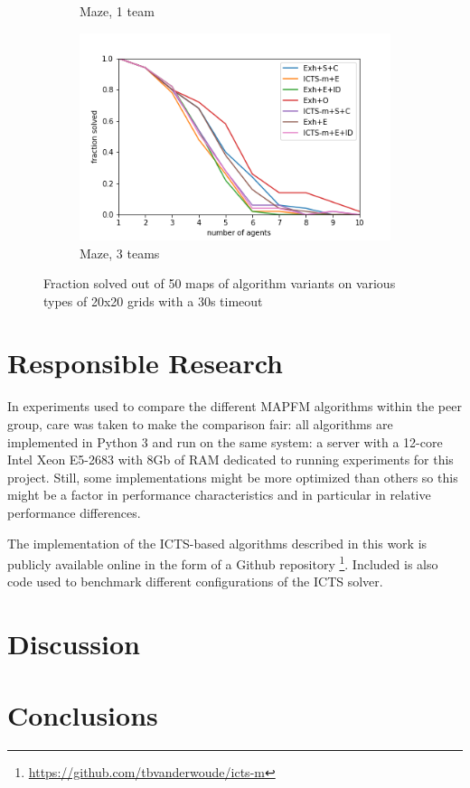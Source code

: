 \documentclass[english]{article}
\begin{document}
\begin{figure}
\begin{subfigure}{0.49\textwidth}
		\caption{Maze, 1 team}
		\label{fig:m1}
	\end{subfigure}
	\begin{subfigure}{0.49\textwidth}
		\centering
		\includegraphics[width=\linewidth]{img/results/maze-3-p}
		\caption{Maze, 3 teams}
		\label{fig:m3}
	\end{subfigure}
	\caption{Fraction solved out of 50 maps of algorithm variants on various types of 20x20 grids with a 30s timeout}
	\label{fig:bottom}
\end{figure}
	\section{Responsible Research}
	In experiments used to compare the different MAPFM algorithms within the peer group, care was taken to make the comparison fair: all algorithms are implemented in Python 3 and run on the same system: a server with a 12-core Intel Xeon E5-2683 with 8Gb of RAM dedicated to running experiments for this project. Still, some implementations might be more optimized than others so this might be a factor in performance characteristics and in particular in relative performance differences.
	
	The implementation of the ICTS-based algorithms described in this work is publicly available online in the form of a Github repository \footnote{\url{https://github.com/tbvanderwoude/icts-m}}. Included is also code used to benchmark different configurations of the ICTS solver.
	
	\section{Discussion}
	\section{Conclusions}
	
\end{document}

